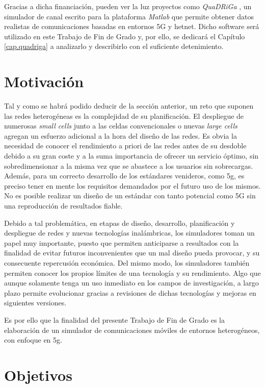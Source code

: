 Gracias a dicha financiación, pueden ver la luz proyectos como \textit{QuaDRiGa} \cite{quadriga}, un simulador de canal escrito para la plataforma \textit{Matlab} que permite obtener datos realistas de comunicaciones basadas en entornos 5G y \acs{hetnet}. Dicho software será utilizado en este Trabajo de Fin de Grado y, por ello, se dedicará el Capítulo \ref{cap.quadriga} a analizarlo y describirlo con el suficiente detenimiento.

\section{Motivación}

Tal y como se habrá podido deducir de la sección anterior, un reto que suponen las redes heterogéneas es la complejidad de su planificación. El despliegue de numerosas \textit{small cells} junto a las celdas convencionales o nuevas \textit{large cells} agregan un esfuerzo adicional a la hora del diseño de las redes. Es obvia la necesidad de conocer el rendimiento a priori de las redes antes de su desdoble debido a su gran coste y a la suma importancia de ofrecer un servicio óptimo, sin sobredimensionar a la misma vez que se abastece a los usuarios sin sobrecargas.
Además, para un correcto desarrollo de los estándares venideros, como \acs{5g}, es preciso tener en mente los requisitos demandados por el futuro uso de los mismos. No es posible realizar un diseño de un estándar con tanto potencial como 5G sin una reproducción de resultados fiable.

Debido a tal problemática, en etapas de diseño, desarrollo, planificación y despliegue de redes y nuevas tecnologías inalámbricas, los simuladores toman un papel muy importante, puesto que permiten anticiparse a resultados con la finalidad de evitar futuros inconvenientes que un mal diseño pueda provocar, y su consecuente repercusión económica. Del mismo modo, los simuladores también permiten conocer los propios límites de una tecnología y su rendimiento. Algo que aunque solamente tenga un uso inmediato en los campos de investigación, a largo plazo permite evolucionar gracias a revisiones de dichas tecnologías y mejoras en siguientes versiones.

Es por ello que la finalidad del presente Trabajo de Fin de Grado es la elaboración de un simulador de comunicaciones móviles de entornos heterogéneos, con enfoque en \acs{5g}.

\section{Objetivos}

